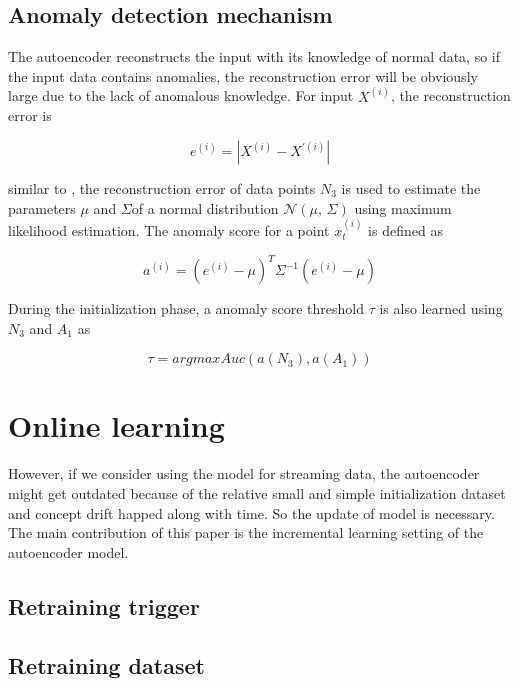 \subsection{Anomaly detection mechanism}
\label{anomalydetection}
The autoencoder reconstructs the input with its knowledge of normal data, so if the input data contains anomalies, the reconstruction error will be obviously large due to the lack of anomalous knowledge. For input $X^{(i)}$, the reconstruction error is 

\begin{equation} \label{eq:error}
e^{(i)}=\left| X^{(i)} - X^{'(i)} \right|
\end{equation}

similar to \cite{encdecad}, the reconstruction error of data points $N_3$ is used to estimate the parameters $\mu$ and $\Sigma$of a normal distribution $\mathcal{N}(\mu,\,\Sigma)$ using maximum likelihood estimation. The anomaly score for a point $x_t^{(i)}$ is defined as 

\begin{equation} \label{eq:score}
a^{(i)}={(e^{(i)}-\mu)}^{T}{\Sigma}^{-1}{(e^{(i)}-\mu)}
\end{equation}

During the initialization phase, a anomaly score threshold $\tau$ is also learned using $N_3$ and $A_1$ as

\begin{equation} \label{eq:threshold}
\tau = argmax Auc(a(N_3),a(A_1))
\end{equation}




\section{Online learning}
\label{sec:Onlinelearning}
However, if we consider using the model for streaming data, the autoencoder might get outdated because of the relative small and simple initialization dataset and concept drift happed along with time. So the update of model is necessary. The main contribution of this paper is the incremental learning setting of the autoencoder model.

\subsection{Retraining trigger}
\label{trigger}

\subsection{Retraining dataset}
\label{data}


